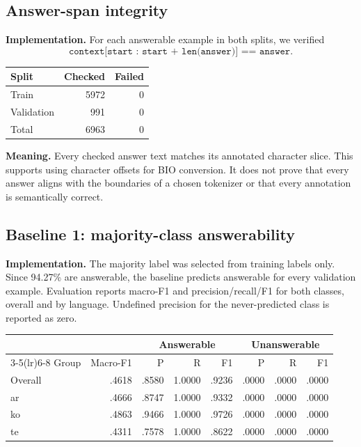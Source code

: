 \documentclass[11pt,a4paper]{article}
\begin{document}
\subsection{Answer-span integrity}
\textbf{Implementation.} For each answerable example in both splits, we verified
\[
\texttt{context[start : start + len(answer)] == answer}.
\]
\begin{center}
\begin{tabular}{lrr}
\toprule
Split & Checked & Failed \\
\midrule
Train & 5972 & 0 \\
Validation & 991 & 0 \\
Total & 6963 & 0 \\
\bottomrule
\end{tabular}
\end{center}
\textbf{Meaning.} Every checked answer text matches its annotated character slice. This supports using character offsets for BIO conversion. It does not prove that every answer aligns with the boundaries of a chosen tokenizer or that every annotation is semantically correct.

\subsection{Baseline 1: majority-class answerability}
\textbf{Implementation.} The majority label was selected from training labels only. Since 94.27\% are answerable, the baseline predicts answerable for every validation example. Evaluation reports macro-F1 and precision/recall/F1 for both classes, overall and by language. Undefined precision for the never-predicted class is reported as zero.

\begin{center}
\small
\begin{tabular}{lrrrrrrr}
\toprule
& & \multicolumn{3}{c}{Answerable} & \multicolumn{3}{c}{Unanswerable} \\
\cmidrule(lr){3-5}\cmidrule(lr){6-8}
Group & Macro-F1 & P & R & F1 & P & R & F1 \\
\midrule
Overall & .4618 & .8580 & 1.0000 & .9236 & .0000 & .0000 & .0000 \\
ar & .4666 & .8747 & 1.0000 & .9332 & .0000 & .0000 & .0000 \\
ko & .4863 & .9466 & 1.0000 & .9726 & .0000 & .0000 & .0000 \\
te & .4311 & .7578 & 1.0000 & .8622 & .0000 & .0000 & .0000 \\
\bottomrule
\end{tabular}
\end{center}
\end{document}

